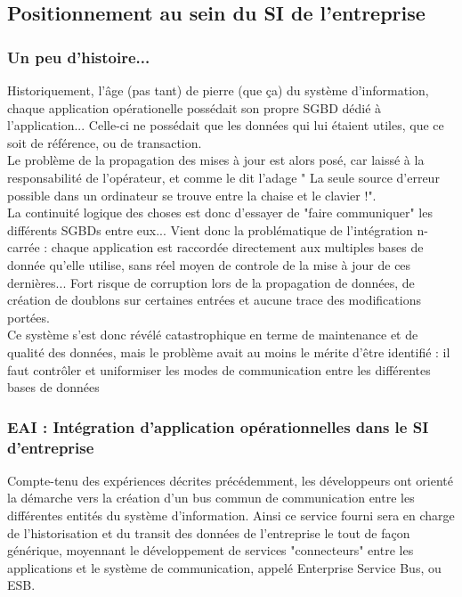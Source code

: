 \subsection{Positionnement au sein du SI de l'entreprise}

\subsubsection{ Un peu d'histoire...}

Historiquement, l'âge (pas tant) de pierre (que ça) du système d'information, chaque application opérationelle possédait son propre SGBD dédié à l'application... Celle-ci ne possédait que les données qui lui étaient utiles, que ce soit de référence, ou de transaction.\\
Le problème de la propagation des mises à jour est alors posé, car laissé à la responsabilité de l'opérateur, et comme le dit l'adage " La seule source d'erreur possible dans un ordinateur se trouve entre la chaise et le clavier !".\\
La continuité logique des choses est donc d'essayer de "faire communiquer" les différents SGBDs entre eux... Vient donc la problématique de l'intégration n-carrée : chaque application est raccordée directement aux multiples bases de donnée qu'elle utilise, sans réel moyen de controle de la mise à jour de ces dernières... Fort risque de corruption lors de la propagation de données, de création de doublons sur certaines entrées et aucune trace des modifications portées. \\
Ce système s'est donc révélé catastrophique en terme de maintenance et de qualité des données, mais le problème avait au moins le mérite d'être identifié : il faut contrôler et uniformiser les modes de communication entre les différentes bases de données\\

\subsubsection{ EAI : Intégration d'application opérationnelles dans le SI d'entreprise}

Compte-tenu des expériences décrites précédemment, les développeurs ont orienté la démarche vers la création d'un bus commun de communication entre les différentes  entités du système d'information. Ainsi ce service fourni sera en charge de l'historisation et du transit des données de l'entreprise le tout de façon générique, moyennant le développement de services "connecteurs" entre les applications et le système de communication, appelé Enterprise Service Bus, ou ESB.\\

